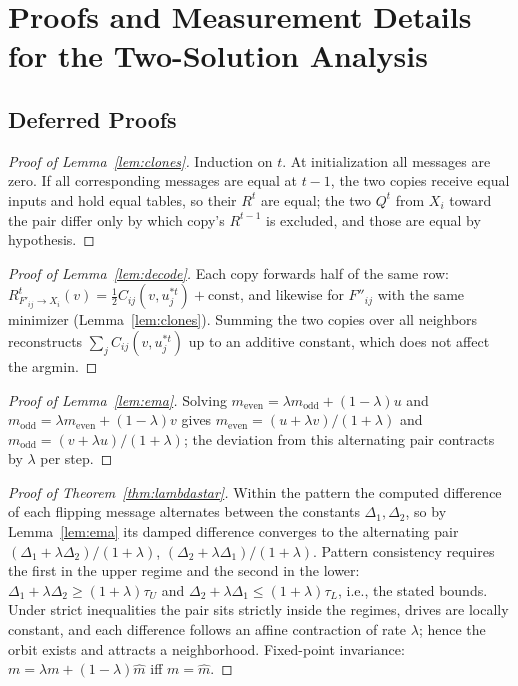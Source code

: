 \section{Proofs and Measurement Details for the Two-Solution Analysis}
\label{app:tworoutes}

\subsection{Deferred Proofs}

\begin{proof}[Proof of Lemma~\ref{lem:clones}]
Induction on $t$.  At initialization all messages are zero.  If all
corresponding messages are equal at $t-1$, the two copies receive equal
inputs and hold equal tables, so their $R^{t}$ are equal; the two $Q^{t}$
from $X_i$ toward the pair differ only by which copy's $R^{t-1}$ is
excluded, and those are equal by hypothesis.
\end{proof}

\begin{proof}[Proof of Lemma~\ref{lem:decode}]
Each copy forwards half of the same row:
$R^{t}_{F'_{ij}\to X_i}(v) = \tfrac12 C_{ij}(v, u^{*t}_j) +
\text{const}$, and likewise for $F''_{ij}$ with the same minimizer
(Lemma~\ref{lem:clones}).  Summing the two copies over all neighbors
reconstructs $\sum_j C_{ij}(v, u^{*t}_j)$ up to an additive constant,
which does not affect the argmin.
\end{proof}

\begin{proof}[Proof of Lemma~\ref{lem:ema}]
Solving $m_{\mathrm{even}} = \lambda m_{\mathrm{odd}} + (1-\lambda)u$ and
$m_{\mathrm{odd}} = \lambda m_{\mathrm{even}} + (1-\lambda)v$ gives
$m_{\mathrm{even}} = (u+\lambda v)/(1+\lambda)$ and
$m_{\mathrm{odd}} = (v+\lambda u)/(1+\lambda)$; the deviation from this
alternating pair contracts by $\lambda$ per step.
\end{proof}

\begin{proof}[Proof of Theorem~\ref{thm:lambdastar}]
Within the pattern the computed difference of each flipping message
alternates between the constants $\Delta_1, \Delta_2$, so by
Lemma~\ref{lem:ema} its damped difference converges to the alternating
pair $(\Delta_1 + \lambda\Delta_2)/(1+\lambda)$,
$(\Delta_2 + \lambda\Delta_1)/(1+\lambda)$.  Pattern consistency requires
the first in the upper regime and the second in the lower:
$\Delta_1 + \lambda\Delta_2 \ge (1+\lambda)\tau_U$ and
$\Delta_2 + \lambda\Delta_1 \le (1+\lambda)\tau_L$, i.e., the stated
bounds.  Under strict inequalities the pair sits strictly inside the
regimes, drives are locally constant, and each difference follows an
affine contraction of rate $\lambda$; hence the orbit exists and attracts
a neighborhood.  Fixed-point invariance:
$m = \lambda m + (1-\lambda)\widehat{m}$ iff $m = \widehat{m}$.
\end{proof}

